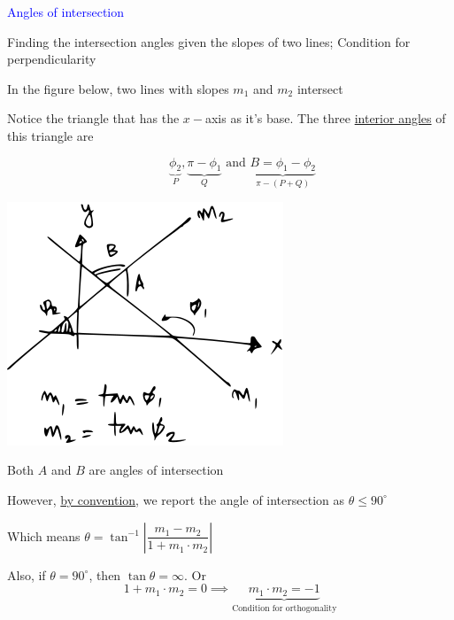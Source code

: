 \documentclass[14pt,fleqn]{extarticle}
\begin{document}
 
\begin{skill}
\begin{narrow}
\textcolor{blue}{Angles of intersection}

Finding the intersection angles given the slopes of two lines; Condition for perpendicularity 
\end{narrow}

\reason 

In the figure below, two lines with slopes $m_1$ and $m_2$ intersect\newline 

Notice the triangle that has the $x-$axis as it's base. The three \underline{interior angles} of this triangle are 

\[\qquad \underbrace{\phi_2}_P,\underbrace{\pi-\phi_1}_Q\text{ and } \underbrace{B = \phi_1-\phi_2}_{\pi - (P+Q)} \]

\begin{center}
\includegraphics[scale=1.6]{figure.svg}
\end{center}

Both $A$ and $B$ are angles of intersection\newline 

However, \underline{by convention}, we report the angle of intersection as $\theta \leq 90^\circ$ \newline 

Which means $\theta = \tan^{-1}\left\vert \dfrac{m_1 - m_2}{1+m_1\cdot m_2}\right\vert$ \newline 

Also, if $\theta=90^\circ$, then $\tan\theta = \infty$. Or 
\[ 1 + m_1\cdot m_2 = 0 \implies \underbrace{m_1\cdot m_2 = -1}_{\text{Condition for orthogonality}} \]

\end{skill} 
\end{document}
